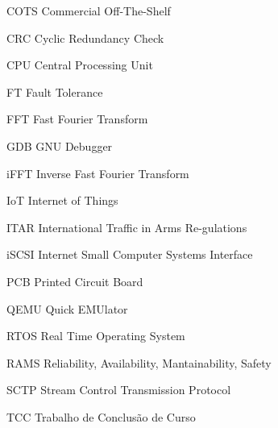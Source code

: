 \listoffigures*
\cleardoublepage


\listofquadros*
\cleardoublepage
\listofequacao*
\cleardoublepage

\begin{siglas}
    \item[COTS]  Commercial Off-The-Shelf
    \item[CRC]   Cyclic Redundancy Check
    \item[CPU]   Central Processing Unit
    \item[FT]    Fault Tolerance
    \item[FFT]   Fast Fourier Transform
    \item[GDB]   GNU Debugger
    \item[iFFT]  Inverse Fast Fourier Transform
    \item[IoT]   Internet of Things
    \item[ITAR]  International Traffic in Arms Re-gulations
    \item[iSCSI] Internet Small Computer Systems Interface
    \item[PCB]   Printed Circuit Board
    \item[QEMU]  Quick EMUlator
    \item[RTOS]  Real Time Operating System
    \item[RAMS]  Reliability, Availability, Mantainability, Safety
    \item[SCTP]  Stream Control Transmission Protocol
    \item[TCC]   Trabalho de Conclusão de Curso
\end{siglas}

\tableofcontents*
\cleardoublepage

